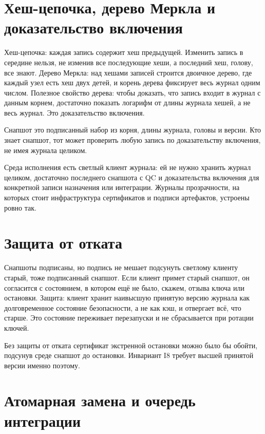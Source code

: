 \section{Хеш-цепочка, дерево Меркла и доказательство включения}

Хеш-цепочка: каждая запись содержит хеш предыдущей. Изменить запись в середине нельзя, не изменив все последующие хеши, а последний хеш, голову, все знают. Дерево Меркла: над хешами записей строится двоичное дерево, где каждый узел есть хеш двух детей, и корень дерева фиксирует весь журнал одним числом. Полезное свойство дерева: чтобы доказать, что запись входит в журнал с данным корнем, достаточно показать логарифм от длины журнала хешей, а не весь журнал. Это доказательство включения.

Снапшот это подписанный набор из корня, длины журнала, головы и версии. Кто знает снапшот, тот может проверить любую запись по доказательству включения, не имея журнала целиком.

\begin{likbez}
Среда исполнения есть светлый клиент журнала: ей не нужно хранить журнал целиком, достаточно последнего снапшота с QC и доказательства включения для конкретной записи назначения или интеграции. Журналы прозрачности, на которых стоит инфраструктура сертификатов и подписи артефактов, устроены ровно так.
\end{likbez}

\section{Защита от отката}

Снапшоты подписаны, но подпись не мешает подсунуть светлому клиенту старый, тоже подписанный снапшот. Если клиент примет старый снапшот, он согласится с состоянием, в котором ещё не было, скажем, отзыва ключа или остановки. Защита: клиент хранит наивысшую принятую версию журнала как долговременное состояние безопасности, а не как кэш, и отвергает всё, что старше. Это состояние переживает перезапуски и не сбрасывается при ротации ключей.

\begin{likbez}
Без защиты от отката сертификат экстренной остановки можно было бы обойти, подсунув среде снапшот до остановки. Инвариант I8 требует высшей принятой версии именно поэтому.
\end{likbez}

\section{Атомарная замена и очередь интеграции}

